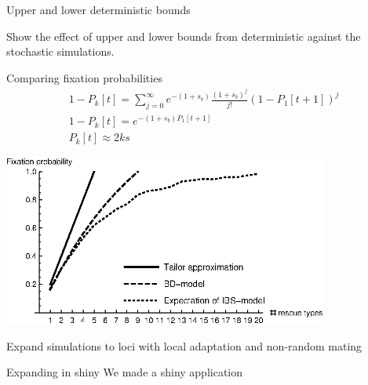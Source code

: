 \documentclass{beamer}
\begin{document}
\begin{frame}{Upper and lower deterministic bounds}
    
    Show the effect of upper and lower bounds from deterministic against the stochastic simulations. 
    
\end{frame}


\begin{frame}{Comparing fixation probabilities}
    \begin{equation*}
    \begin{array}{l}
    1-P_k[t]=\sum_{j=0}^{\infty} e^{-(1+s_b)}\frac{(1+s_b)^j}{j!}(1-P_1[t+1])^j\\
    1-P_k[t]=e^{-(1+s_b)P_1[t+1]}\\
    P_k[t]\approx 2 k s
    \end{array}
    \end{equation*}
    
    \includegraphics[width=0.8\textwidth]{Rfiles/figures/FixationProb.eps}
    
\end{frame}

\begin{frame}{Expand simulations to loci with local adaptation and non-random mating}
    
\end{frame}

\begin{frame}{Expanding in shiny}
    We made a shiny application
\end{frame}
\end{document}
